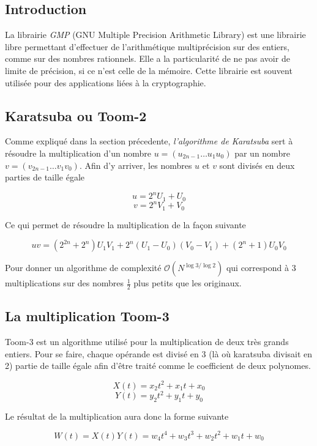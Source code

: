 \documentclass[letterpaper]{article}
\begin{document}
\subsection{Introduction}

La librairie \emph{GMP} (GNU Multiple Precision Arithmetic Library) est une
librairie libre permettant d'effectuer de l'arithmétique multiprécision sur
des entiers, comme sur des nombres rationnels. Elle a la particularité de ne pas
avoir de limite de précision, si ce n'est celle de la mémoire.
\newline
Cette librairie est souvent utilisée pour des applications liées à la
cryptographie\cite{wikigmp}.

\subsection{Karatsuba ou Toom-2}

Comme expliqué dans la section précedente, \emph{l'algorithme de Karatsuba} sert
à résoudre la multiplication d'un nombre $u = (u_{2n-1} \dots u_1 u_0)$ par un
nombre $v = (v_{2n-1} \dots v_1 v_0)$. Afin d'y arriver, les nombres $u$ et $v$
sont divisés en deux parties de taille égale

  $$u = 2^{n} U_1 + U_0$$
  $$v = 2^{n} V_1 + V_0$$

Ce qui permet de résoudre la multiplication de la façon suivante

  $$uv = (2^{2n} + 2^n) U_1 V_1 + 2^n (U_1 - U_0) (V_0 - V_1) + (2^n + 1) U_0 V_0$$

Pour donner un algorithme de complexité $\mathcal{O}(N^{\log{3}/\log{2}})$ qui
correspond à $3$ multiplications sur des nombres $\frac{1}{2}$ plus petits que
les originaux\cite{gmplibkaratsuba}.

\subsection{La multiplication Toom-3}

Toom-3 est un algorithme utilisé pour la multiplication de deux très grands
entiers. Pour se faire, chaque opérande est divisé en 3 (là où karatsuba
divisait en 2) partie de taille égale afin d'être traité comme le
coefficient de deux polynomes\cite{gmplib2014}.

    $$X(t) = x_2 t^2 + x_1 t + x_0$$
    $$Y(t) = y_2 t^2 + y_1 t + y_0$$

Le résultat de la multiplication aura donc la forme suivante

    $$W(t) = X(t) Y(t) =  w_4 t^4 + w_3 t^3 + w_2 t^2 + w_1 t + w_0$$
\end{document}
